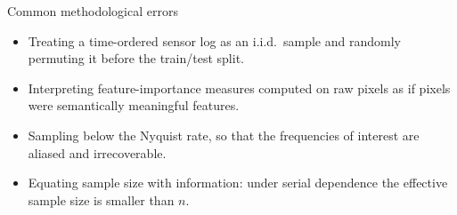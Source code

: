 \begin{frame}{Common methodological errors}
\begin{itemize}
\item Treating a time-ordered sensor log as an i.i.d.\ sample and randomly permuting it before the train/test split.
\item Interpreting feature-importance measures computed on raw pixels as if pixels were semantically meaningful features.
\item Sampling below the Nyquist rate, so that the frequencies of interest are aliased and irrecoverable.
\item Equating sample size with information: under serial dependence the effective sample size is smaller than $n$.
\end{itemize}
\coursefooter
\end{frame}

